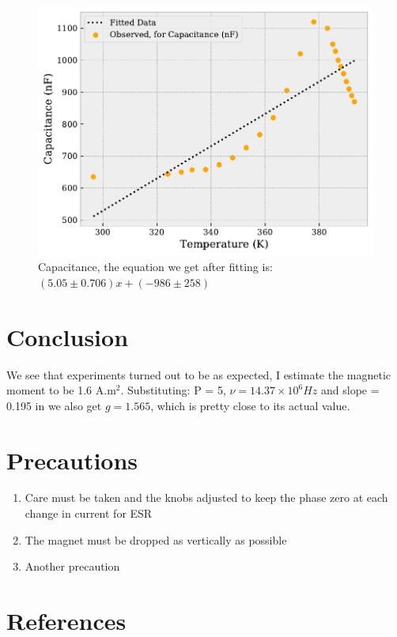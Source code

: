 \documentclass{double}
\begin{document}
\begin{figure}[H]
\centering
\includegraphics[width = \columnwidth]{./Capacitancealphaunit0.pdf}
\caption{Capacitance, the equation we get after fitting is: $(5.05 \pm 0.706)x + (-986 \pm 258)$}
\label{g:"capacitance"}
\end{figure}
\section{Conclusion}
We see that experiments turned out to be as expected, I estimate the magnetic moment to be 1.6 A.m$^2$. Substituting: P = 5, $\nu = 14.37 \times 10^6 Hz$ and slope = 0.195 in we also get $g = 1.565$, which is pretty close to its actual value.


\section{Precautions}

\begin{enumerate}
	\item Care must be taken and the knobs adjusted to keep the phase zero at each change in current for ESR
	\item The magnet must be dropped as vertically as possible
	\item Another precaution
\end{enumerate}


\section{References}
\nocite{*}
\printbibliography[heading=none]
\end{document}
